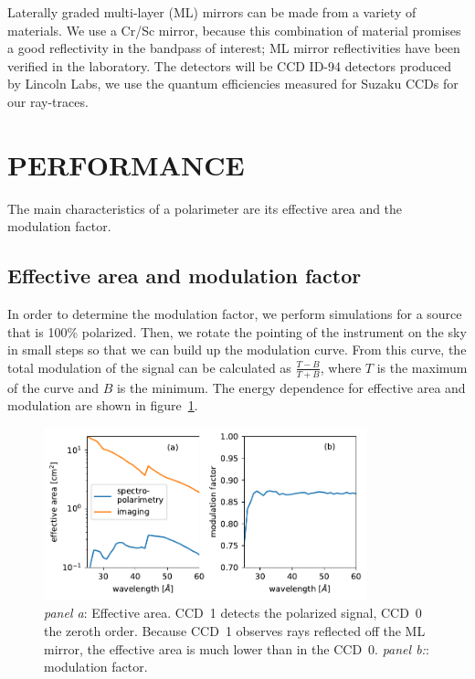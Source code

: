 \documentclass[]{spie}  %
\begin{document}
Laterally graded multi-layer (ML) mirrors can be made from a variety
of materials. We use a Cr/Sc mirror, because this combination of
material promises a good reflectivity in the bandpass of interest; ML
mirror reflectivities have been verified in the
laboratory\cite{10.1117/12.2188452}. The detectors will be CCD ID-94
detectors produced by Lincoln Labs, we use the quantum efficiencies
measured for Suzaku CCDs\cite{2007PASJ...59S..23K} for our ray-traces.

\section{PERFORMANCE}
\label{sect:performance}
The main characteristics of a polarimeter are its effective area and the modulation factor.

\subsection{Effective area and modulation factor}
In order to determine the modulation factor, we perform simulations
for a source that is 100\% polarized. Then, we rotate the pointing of
the instrument on the sky in small steps so that we can build up the
modulation curve. From this curve, the total modulation of the signal
can be calculated as $\frac{T-B}{T + B}$, where $T$ is the maximum of
the curve and $B$ is the minimum. The energy dependence for effective
area and modulation are shown in figure~\ref{fig:aeff}.
\begin{figure} [ht]
  \begin{center}
    \includegraphics[height=5cm]{aeff.pdf}
  \end{center}
  \caption
      { \label{fig:aeff} \emph{panel a}: Effective area. CCD~1 detects
        the polarized signal, CCD~0 the zeroth order. Because CCD~1
        observes rays reflected off the ML mirror, the effective area
        is much lower than in the CCD~0. \emph{panel b:}: modulation
        factor.  }
\end{figure}
\end{document}
